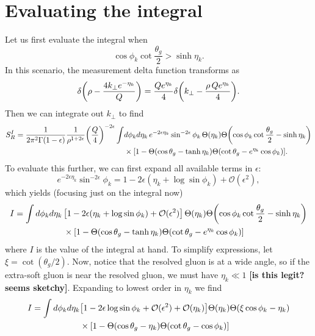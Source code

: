 \documentclass[11pt,twoside,reqno]{amsart}
\theoremstyle{plain}
\theoremstyle{remark}
\theoremstyle{definition}
\theoremstyle{remark}
\theoremstyle{definition}
\theoremstyle{definition}
\newcommand{\cO}{\mathcal{O}}
\begin{document}
\section{Evaluating the integral}
	Let us first evaluate the integral when
	\begin{equation}
		\cos\phi_k \cot\frac{\theta_g}{2} > \sinh\eta_k.
	\end{equation}
	In this scenario, the measurement delta function transforms as
	\begin{equation}
		\delta\qty(\rho - \frac{4k_\perp e^{-\eta_k}}{Q}) = \frac{Q e^{\eta_k}}{4}\delta\qty(k_\perp - \frac{\rho\,Q e^{\eta_k}}{4}).
	\end{equation}
	Then we can integrate out $k_\perp$ to find
	\begin{equation}
	\begin{aligned}
		S_R^I = \frac{1}{2\pi^2\Gamma(1-\epsilon)} \frac{1}{\rho^{1+2\epsilon}} \qty(\frac{Q}{4})^{-2\epsilon} \int& d\phi_k d\eta_k \,e^{-2\epsilon\eta_k} \sin^{-2\epsilon}\phi_k\,\Theta(\eta_k) \Theta\qty(\cos\phi_k\cot\frac{\theta_g}{2} - \sinh\eta_k) \\
		&\times \qty[1 - \Theta(\cos\theta_g - \tanh\eta_k)\Theta(\cot\theta_g - e^{\eta_k}\cos\phi_k)].
	\end{aligned}
	\end{equation}
	To evaluate this further, we can first expand all available terms in $\epsilon$:
	\begin{equation}
		e^{-2\epsilon\eta_k} \sin^{-2\epsilon}\phi_k = 1 - 2\epsilon(\eta_k + \log\sin\phi_k) + \cO(\epsilon^2),
	\end{equation}
	which yields (focusing just on the integral now)
	\begin{equation}
	\begin{aligned}
		I = \int d\phi_k d\eta_k \,&\qty[1 - 2\epsilon(\eta_k + \log\sin\phi_k) + \cO(\epsilon^2)]\,\Theta(\eta_k) \Theta\qty(\cos\phi_k\cot\frac{\theta_g}{2} - \sinh\eta_k) \\
		&\times \qty[1 - \Theta(\cos\theta_g - \tanh\eta_k)\Theta(\cot\theta_g - e^{\eta_k}\cos\phi_k)]
	\end{aligned}
	\end{equation}
	where $I$ is the value of the integral at hand. To simplify expressions, let $\xi = \cot(\theta_g/2)$. Now, notice that the resolved gluon is at a wide angle, so if the extra-soft gluon is near the resolved gluon, we must have $\eta_k \ll 1$ {\color{red}\textbf{[is this legit? seems sketchy]}}. Expanding to lowest order in $\eta_k$ we find
	\begin{equation}
	\begin{aligned}
		I = \int d\phi_k d\eta_k &\qty[1 - 2\epsilon \log\sin\phi_k + \cO(\epsilon^2) + \cO(\eta_k)] \Theta(\eta_k)\Theta(\xi\cos\phi_k - \eta_k) \\
		&\times\qty[1 - \Theta(\cos\theta_g - \eta_k)\Theta(\cot\theta_g - \cos\phi_k)]
	\end{aligned}
	\end{equation}
\end{document}
